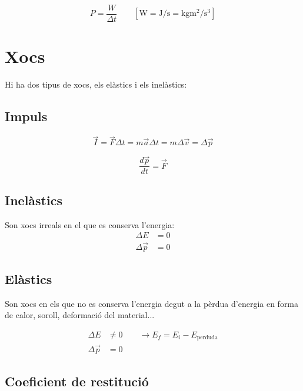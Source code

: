 \begin{equation}
    P = \frac{W}{\Delta t} \qquad \left[  \si{\watt} =\si{\joule\per\second} = \si{\kilo\gram\metre\squared\per\second\cubed}\right]
\end{equation}

\section{Xocs}
\label{sec:xocs}

Hi ha dos tipus de xocs, els elàstics i els inelàstics:

\subsection{Impuls}
\label{sub:impuls}

\begin{equation}
    \vec{I} = \vec{F}\Delta t = m \vec{a} \Delta t = m \Delta \vec{v} = \Delta \vec{p}
\end{equation}

\begin{equation}
    \frac{d\vec{p}}{dt} = \vec{F}
\end{equation}

\subsection{Inelàstics}
\label{sub:inelastics}

Son xocs irreals en el que es conserva l'energia:
\begin{align}
    \Delta E &= 0 \\
    \Delta \vec{p} &= 0
\end{align}

\subsection{Elàstics}
\label{sub:elastics}

Son xocs en els que no es conserva l'energia degut a la pèrdua d'energia en forma de calor, soroll, deformació del material...

\begin{align}
    \Delta E &\neq 0 \qquad \rightarrow E_f = E_i - E_\text{perduda}\\
    \Delta \vec{p} &= 0
\end{align}

\subsection{Coeficient de restitució}
\label{sub:coeficient_de_restitucio}

